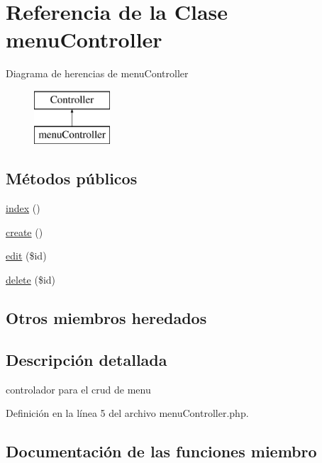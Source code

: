 \hypertarget{classmenu_controller}{}\section{Referencia de la Clase menu\+Controller}
\label{classmenu_controller}
Diagrama de herencias de menu\+Controller\begin{figure}[H]
\begin{center}
\leavevmode
\includegraphics[height=2.000000cm]{classmenu_controller}
\end{center}
\end{figure}
\subsection*{Métodos públicos}
\begin{DoxyCompactItemize}
\item 
\mbox{\hyperlink{classmenu_controller_a2b51402e97607111f6674ca41be2e77a}{index}} ()
\item 
\mbox{\hyperlink{classmenu_controller_a9de27fd704a75ea2e20f1897efbe50fa}{create}} ()
\item 
\mbox{\hyperlink{classmenu_controller_a302abc24e5cf18433bffd1b3eae79dd1}{edit}} (\$id)
\item 
\mbox{\hyperlink{classmenu_controller_a3e835912cd6cdd07fd0eb71bac19c675}{delete}} (\$id)
\end{DoxyCompactItemize}
\subsection*{Otros miembros heredados}


\subsection{Descripción detallada}
controlador para el crud de menu 

Definición en la línea 5 del archivo menu\+Controller.\+php.



\subsection{Documentación de las funciones miembro}
\mbox{\label{classmenu_controller_a9de27fd704a75ea2e20f1897efbe50fa}} 
